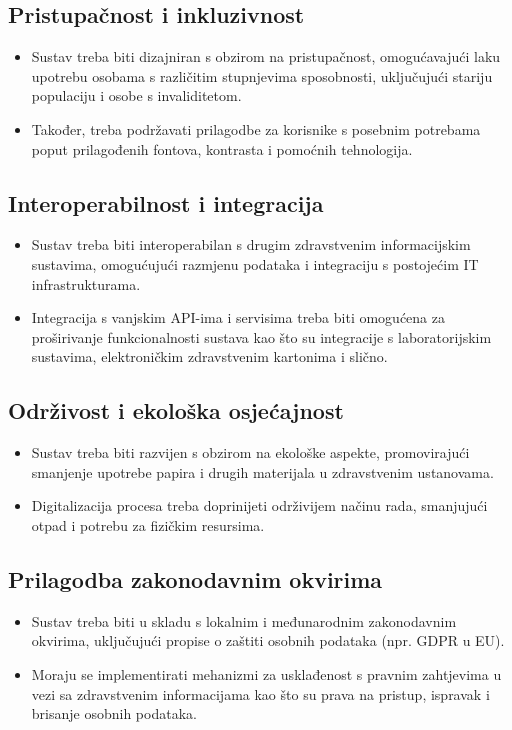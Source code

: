 \subsection*{Pristupačnost i inkluzivnost}
\begin{itemize}
\item Sustav treba biti dizajniran s obzirom na pristupačnost, omogućavajući laku upotrebu osobama s različitim stupnjevima sposobnosti, uključujući stariju populaciju i osobe s invaliditetom.
\item Također, treba podržavati prilagodbe za korisnike s posebnim potrebama poput prilagođenih fontova, kontrasta i pomoćnih tehnologija.
\end{itemize}

\subsection*{Interoperabilnost i integracija}
\begin{itemize}
    \item Sustav treba biti interoperabilan s drugim zdravstvenim informacijskim sustavima, omogućujući razmjenu podataka i integraciju s postojećim IT infrastrukturama.
    \item Integracija s vanjskim API-ima i servisima treba biti omogućena za proširivanje funkcionalnosti sustava kao što su integracije s laboratorijskim sustavima, elektroničkim zdravstvenim kartonima i slično.
\end{itemize}

\subsection*{Održivost i ekološka osjećajnost}
\begin{itemize}
    \item Sustav treba biti razvijen s obzirom na ekološke aspekte, promovirajući smanjenje upotrebe papira i drugih materijala u zdravstvenim ustanovama.
    \item Digitalizacija procesa treba doprinijeti održivijem načinu rada, smanjujući otpad i potrebu za fizičkim resursima.
\end{itemize}

\subsection*{Prilagodba zakonodavnim okvirima}
\begin{itemize}
    \item Sustav treba biti u skladu s lokalnim i međunarodnim zakonodavnim okvirima, uključujući propise o zaštiti osobnih podataka (npr. GDPR u EU).
    \item Moraju se implementirati mehanizmi za usklađenost s pravnim zahtjevima u vezi sa zdravstvenim informacijama kao što su prava na pristup, ispravak i brisanje osobnih podataka.
\end{itemize}

